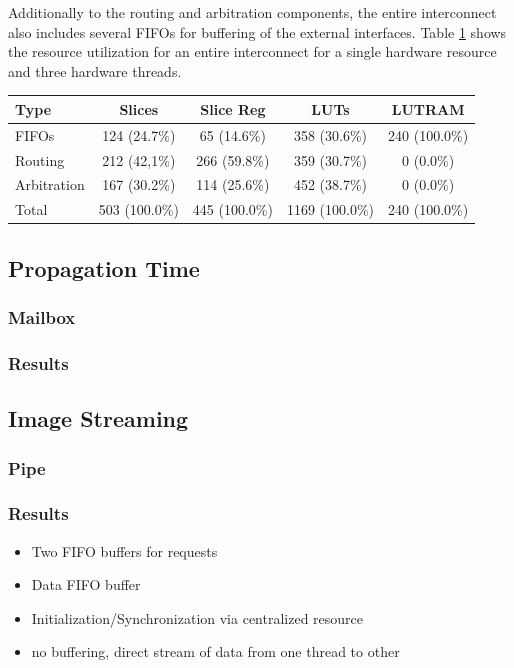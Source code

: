 Additionally to the routing and arbitration components, the entire
interconnect also includes several \acp{FIFO} for buffering of the external
interfaces. Table \ref{tab:crossbar_util} shows the resource utilization for
an entire interconnect for a single hardware resource and three hardware
threads.
\begin{table}
	\centering
	\label{tab:crossbar_util}
	\begin{tabular}{lcccc}
	\hline
	\textbf{Type} & \textbf{Slices} & \textbf{Slice Reg} & \textbf{LUTs} & \textbf{LUTRAM}\\
	\hline
	\acp{FIFO} & 124 (24.7\%) & 65 (14.6\%) & 358 (30.6\%) & 240 (100.0\%)\\
	Routing & 212 (42,1\%) & 266 (59.8\%) & 359 (30.7\%) & 0 (0.0\%)\\
	Arbitration & 167 (30.2\%) & 114 (25.6\%) & 452 (38.7\%) & 0 (0.0\%)\\
	\hline
	Total & 503 (100.0\%) & 445 (100.0\%) & 1169 (100.0\%) & 240 (100.0\%)\\
	\hline
	\end{tabular}
\end{table}


\subsection{Propagation Time}
\subsubsection{Mailbox}
\subsubsection{Results}
\subsection{Image Streaming}
\subsubsection{Pipe}
\subsubsection{Results}


\begin{itemize}
\item Two FIFO buffers for requests
\item Data FIFO buffer
\end{itemize}
\begin{itemize}
\item Initialization/Synchronization via centralized resource
\item no buffering, direct stream of data from one thread to other
\end{itemize}